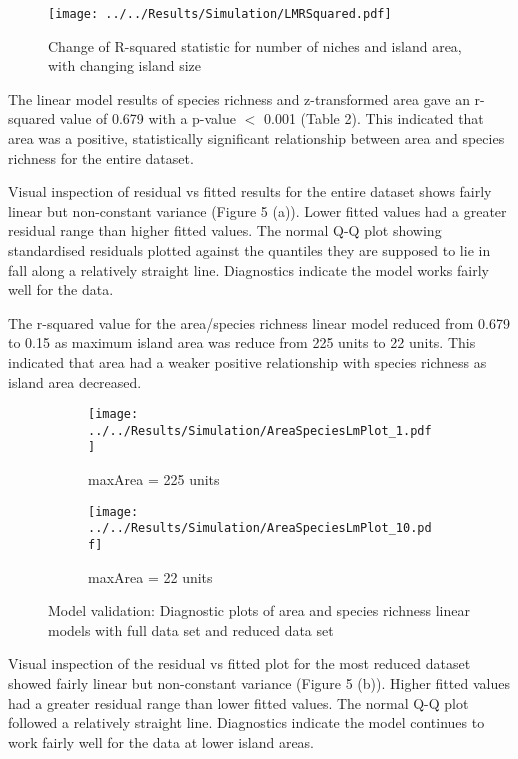 \documentclass{article}
\begin{document}
\begin{figure}[h!]
\centering
  \texttt{[image: ../../Results/Simulation/LMRSquared.pdf]}
  \caption{Change of R-squared statistic for number of niches and island area, with changing island size}
  \label{fig:R-Squared statistic}
\end{figure}

The linear model results of species richness and z-transformed area gave an r-squared value of 0.679 with a p-value $<$ 0.001 (Table 2). This indicated that area was a positive, statistically significant relationship between area and species richness for the entire dataset. \bigskip

Visual inspection of residual vs fitted results for the entire dataset shows fairly linear but non-constant variance (Figure 5 (a)). Lower fitted values had a greater residual range than higher fitted values. The normal Q-Q plot showing standardised residuals plotted against the quantiles they are supposed to lie in fall along a relatively straight line. Diagnostics indicate the model works fairly well for the data.  \bigskip

The r-squared value for the area/species richness linear model reduced from 0.679 to 0.15 as maximum island area was reduce from 225 units to 22 units. This indicated that area had a weaker positive relationship with species richness as island area decreased. \bigskip

\begin{figure}[h!]
  \centering
  \begin{subfigure}[b]{0.4\linewidth}
    \texttt{[image: ../../Results/Simulation/AreaSpeciesLmPlot\_1.pdf]}
    \caption{maxArea = 225 units}
  \end{subfigure}
  \begin{subfigure}[b]{0.4\linewidth}
    \texttt{[image: ../../Results/Simulation/AreaSpeciesLmPlot\_10.pdf]}
    \caption{maxArea = 22 units}
  \end{subfigure}
  \caption{Model validation: Diagnostic plots of area and species richness linear models with full data set and reduced data set}
  \label{fig:Model validation area/species LM}
\end{figure}

Visual inspection of the residual vs fitted plot for the most reduced dataset showed fairly linear but non-constant variance (Figure 5 (b)). Higher fitted values had a greater residual range than lower fitted values. The normal Q-Q plot followed a relatively straight line. Diagnostics indicate the model continues to work fairly well for the data at lower island areas. \bigskip
\end{document}
